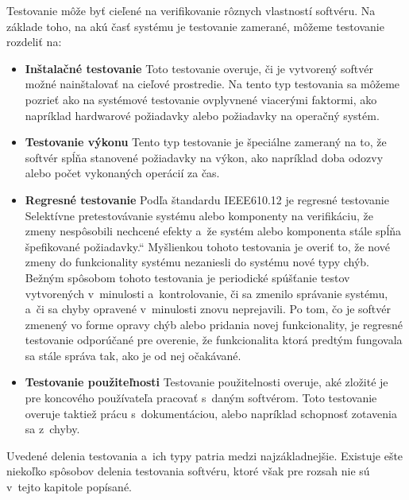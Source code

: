 \noindent Testovanie môže byť cieľené na verifikovanie rôznych vlastností softvéru. 
Na základe toho, na akú časť systému je 
testovanie zamerané, môžeme testovanie rozdeliť na:
\begin{itemize}
\item \textbf{Inštalačné testovanie}
Toto testovanie overuje, či je vytvorený softvér možné nainštalovať
na cieľové prostredie. Na tento typ testovania sa môžeme pozrieť ako na 
systémové testovanie ovplyvnené viacerými faktormi, ako napríklad 
hardwarové požiadavky alebo požiadavky na operačný systém. 

\item \textbf{Testovanie výkonu}
Tento typ testovanie je špeciálne zameraný na to, že softvér spĺňa 
stanovené požiadavky na výkon, ako napríklad doba odozvy alebo počet 
vykonaných operácií za čas. 

\item \textbf{Regresné testovanie} 
\label{sekcia:regresne_testovanie}
Podľa štandardu IEEE610.12 \cite{Ieee_glossary} je regresné testovanie 
\quotedblbase Selektívne pretestovávanie systému alebo komponenty na 
verifikáciu, že zmeny nespôsobili nechcené efekty a~že systém alebo
komponenta stále spĺňa špefikované požiadavky.\textquotedblleft
Myšlienkou tohoto testovania je overiť to, že nové zmeny do funkcionality 
systému nezaniesli do systému nové typy chýb.
Bežným spôsobom tohoto testovania je periodické spúšťanie testov 
vytvorených v~minulosti a~kontrolovanie, či sa zmenilo správanie
systému, a~či sa chyby opravené v~minulosti znovu neprejavili. Po tom, 
čo je softvér zmenený vo forme opravy chýb alebo pridania novej 
funkcionality, je regresné testovanie odporúčané pre overenie, že 
funkcionalita ktorá predtým fungovala sa stále správa tak, ako je od 
nej očakávané.

\item \textbf{Testovanie použiteľnosti}
Testovanie použitelnosti overuje, aké zložité je pre koncového 
používateľa pracovať s~daným softvérom. Toto testovanie overuje taktiež 
prácu s~dokumentáciou, alebo napríklad schopnosť zotavenia sa z~chyby. 
\end{itemize}

Uvedené delenia testovania a~ich typy patria medzi najzákladnejšie. 
Existuje ešte niekoľko spôsobov delenia testovania softvéru, ktoré však 
pre rozsah nie sú v~tejto kapitole popísané.



